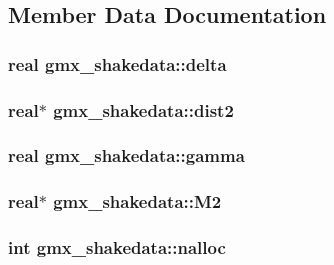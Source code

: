 \subsection{\-Member \-Data \-Documentation}
\hypertarget{structgmx__shakedata_a46b0acd31a830f5352e46c67f62aff27}{
\subsubsection[{delta}]{\setlength{\rightskip}{0pt plus 5cm}real {\bf gmx\-\_\-shakedata\-::delta}}}\label{structgmx__shakedata_a46b0acd31a830f5352e46c67f62aff27}
\hypertarget{structgmx__shakedata_af280281af2429eee02f6b2d4da42820f}{
\subsubsection[{dist2}]{\setlength{\rightskip}{0pt plus 5cm}real$\ast$ {\bf gmx\-\_\-shakedata\-::dist2}}}\label{structgmx__shakedata_af280281af2429eee02f6b2d4da42820f}
\hypertarget{structgmx__shakedata_afd9c7cb21efc0468d35b3973b426662e}{
\subsubsection[{gamma}]{\setlength{\rightskip}{0pt plus 5cm}real {\bf gmx\-\_\-shakedata\-::gamma}}}\label{structgmx__shakedata_afd9c7cb21efc0468d35b3973b426662e}
\hypertarget{structgmx__shakedata_a32dc43b8fe8c5571f91243fdb147f070}{
\subsubsection[{\-M2}]{\setlength{\rightskip}{0pt plus 5cm}real$\ast$ {\bf gmx\-\_\-shakedata\-::\-M2}}}\label{structgmx__shakedata_a32dc43b8fe8c5571f91243fdb147f070}
\hypertarget{structgmx__shakedata_a3c28db380c26db39b4350df68eb3e513}{
\subsubsection[{nalloc}]{\setlength{\rightskip}{0pt plus 5cm}int {\bf gmx\-\_\-shakedata\-::nalloc}}}\label{structgmx__shakedata_a3c28db380c26db39b4350df68eb3e513}
